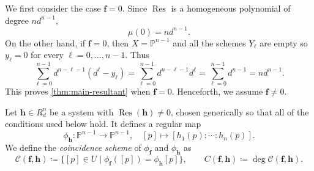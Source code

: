 \documentclass[11pt,letterpaper]{article}
\numberwithin{equation}{section}
\newcommand{\PP}{\mathbb{P}}
\newcommand{\ff}{\ensuremath{\boldsymbol{f}}}
\newcommand{\hh}{\ensuremath{\boldsymbol{h}}}
\DeclareMathOperator{\Res}{Res}
\begin{document}
We first consider the case $\ff=0$.
Since $\Res$ is a homogeneous polynomial of degree $nd^{n-1}$, \[
\mu(0) = n d^{n-1}.
\] On the other hand, if $\ff=0$, then $X=\PP^{n-1}$ and all the schemes $Y_\ell$ are empty so $y_\ell=0$ for every $\ell=0,\dots,n-1$.
Thus \[
\sum_{\ell=0}^{n-1} d^{n-\ell-1}(d^{\ell}-y_\ell) = \sum_{\ell=0}^{n-1} d^{n-\ell-1} d^{\ell} = \sum_{\ell=0}^{n-1}d^{n-1} = nd^{n-1}.
\] This proves \cref{thm:main-resultant} when $\ff=0$.
Henceforth, we assume $\ff\neq 0$.

Let $\hh\in R_d^n$ be a system with $\Res(\hh)\neq 0$, chosen generically so that all of the conditions used below hold.
It defines a regular map \[
\phi_{\hh}:\PP^{n-1}\rightarrow\PP^{n-1},\quad [p]\mapsto [h_1(p):\cdots : h_n(p)].
\]
We define the \emph{coincidence scheme} of $\phi_{\ff}$ and $\phi_{\hh}$ as \[
\mathcal{C}(\ff,\hh) \coloneqq \{[p]\in U \mid \phi_{\ff}([p])=\phi_{\hh}[p]\}, \qquad C(\ff,\hh)\coloneqq\deg \mathcal{C}(\ff,\hh).
\]
\end{document}
